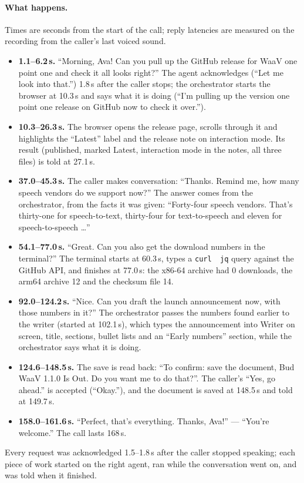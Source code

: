 \paragraph{What happens.} Times are seconds from the start of the call; reply latencies are measured on the
recording from the caller's last voiced sound.
\begin{itemize}
\item \textbf{1.1--6.2\,s.} ``Morning, Ava! Can you pull up the GitHub release for WaaV one point one and check it all
looks right?'' The agent acknowledges (``Let me look into that.'') 1.8\,s after the caller stops; the orchestrator
starts the browser at 10.3\,s and says what it is doing (``I'm pulling up the version one point one release on
GitHub now to check it over.'').
\item \textbf{10.3--26.3\,s.} The browser opens the release page, scrolls through it and highlights the ``Latest''
label and the release note on interaction mode. Its result (published, marked Latest, interaction mode in the
notes, all three files) is told at 27.1\,s.
\item \textbf{37.0--45.3\,s.} The caller makes conversation: ``Thanks. Remind me, how many speech vendors do we
support now?'' The answer comes from the orchestrator, from the facts it was given: ``Forty-four speech vendors.
That's thirty-one for speech-to-text, thirty-four for text-to-speech and eleven for speech-to-speech \ldots''
\item \textbf{54.1--77.0\,s.} ``Great. Can you also get the download numbers in the terminal?'' The terminal starts at
60.3\,s, types a \texttt{curl \textbar\ jq} query against the GitHub API, and finishes at 77.0\,s: the x86-64 archive
had 0 downloads, the arm64 archive 12 and the checksum file 14.
\item \textbf{92.0--124.2\,s.} ``Nice. Can you draft the launch announcement now, with those numbers in it?'' The
orchestrator passes the numbers found earlier to the writer (started at 102.1\,s), which types the announcement
into Writer on screen, title, sections, bullet lists and an ``Early numbers'' section, while the orchestrator says
what it is doing.
\item \textbf{124.6--148.5\,s.} The save is read back: ``To confirm: save the document, Bud WaaV 1.1.0 Is Out. Do you
want me to do that?''. The caller's ``Yes, go ahead.'' is accepted (``Okay.''), and the document is saved at
148.5\,s and told at 149.7\,s.
\item \textbf{158.0--161.6\,s.} ``Perfect, that's everything. Thanks, Ava!'' --- ``You're welcome.'' The call lasts
168\,s.
\end{itemize}
Every request was acknowledged 1.5--1.8\,s after the caller stopped speaking; each piece of work started on the
right agent, ran while the conversation went on, and was told when it finished.

